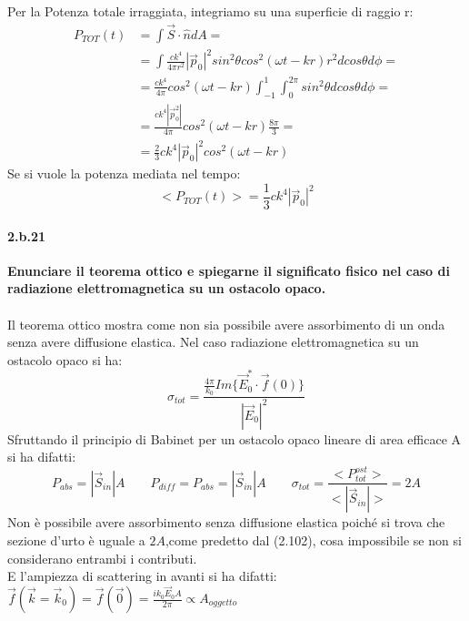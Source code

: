 \documentclass[twoside]{article}
\begin{document}
Per la Potenza totale irraggiata, integriamo su una superficie di raggio r:
\begin{align*}
    P_{TOT}(t)&=\int \vec{S}\cdot \hat{n} dA=\\
    &=\int \frac{ck^4}{ 4 \pi r^2 }|\vec{p}_0|^2sin^2\theta cos^2(\omega t-k r) r^2 dcos\theta d\phi=\\
    &=\frac{ck^4}{ 4 \pi}cos^2(\omega t-k r)\int_{-1}^1\int_{0}^{2\pi} sin^2\theta dcos\theta d\phi=\\
    &=\frac{ck^4|\vec{p}_0^2|}{4\pi}cos^2(\omega t-kr)\frac{8\pi}{3}=\\
    &=\frac{2}{3}ck^4|\vec{p}_0|^2cos^2(\omega t-k r)
\end{align*}
Se si vuole la potenza mediata nel tempo:
\begin{equation}
    <P_{TOT}(t)> =\frac{1}{3}ck^4|\vec{p}_0|^2
\end{equation}

\paragraph{2.b.21}\textbf{Enunciare il teorema ottico e spiegarne il significato fisico nel caso di radiazione elettromagnetica su un ostacolo opaco.}\\ \\
Il teorema ottico mostra come non sia possibile avere assorbimento di un onda senza avere diffusione elastica. Nel caso radiazione elettromagnetica su un ostacolo opaco si ha:
\begin{equation}
    \sigma_{tot}=\frac{\frac{4\pi}{k_0}Im\{\vec{E}_0^*\cdot\vec{f}(0)\}}{|\vec{E}_0|^2}
\end{equation}
Sfruttando il principio di Babinet per un ostacolo opaco lineare di area efficace A si ha difatti:
\begin{equation}
    P_{abs}=|\vec{S}_{in}|A \qquad P_{diff}=P_{abs}=|\vec{S}_{in}|A \qquad \sigma_{tot}=\frac{<P_{tot}^{ost}>}{<|\vec{S}_{in}|>}=2A
\end{equation}
Non è possibile avere assorbimento senza diffusione elastica poiché si trova che sezione d'urto è uguale a $2A$,come predetto dal (2.102), cosa impossibile se non si considerano entrambi i contributi. \\
E l'ampiezza di scattering in avanti si ha difatti: $\vec{f}(\vec{k}=\vec{k}_0)= \vec{f}(\vec{0})=\frac{ik_0\vec{E}_0A}{2\pi} \propto A_{oggetto}$
\end{document}
